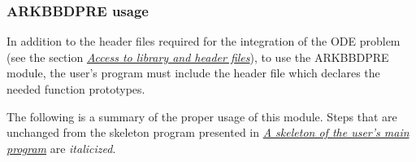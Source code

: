 \documentclass[letterpaper,10pt,english]{sphinxmanual}
\begin{document}
\subsubsection{ARKBBDPRE usage}
\label{c_interface/Preconditioners:arkbbdpre-usage}
In addition to the header files required for the integration of the
ODE problem (see the section {\hyperref[c_interface/General:cinterface-headers]{\emph{Access to library and header files}}}), to use the
ARKBBDPRE module, the user's program must include the header file
 which declares the needed function prototypes.

The following is a summary of the proper usage of this module. Steps
that are unchanged from the skeleton program presented in
{\hyperref[c_interface/Skeleton:cinterface-skeleton]{\emph{A skeleton of the user's main program}}} are \emph{italicized}.
\end{document}

